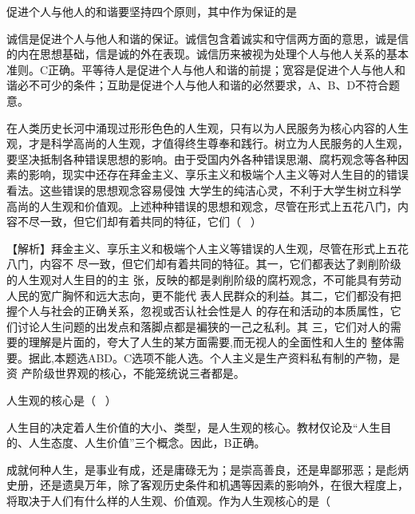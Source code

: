 \question 促进个人与他人的和谐要坚持四个原则，其中作为保证的是
\par{}
\begin{solution}诚信是促进个人与他人和谐的保证。诚信包含着诚实和守信两方面的意思，诚是信的内在思想基础，信是诚的外在表现。诚信历来被视为处理个人与他人关系的基本准则。C正确。平等待人是促进个人与他人和谐的前提；宽容是促进个人与他人和谐必不可少的条件；互助是促进个人与他人和谐的必然要求，A、B、D不符合题意。
\end{solution}
\question 在人类历史长河中涌现过形形色色的人生观，只有以为人民服务为核心内容的人生观，才是科学高尚的人生观，才值得终生尊奉和践行。树立为人民服务的人生观，要坚决抵制各种错误思想的影响。由于受国内外各种错误思潮、腐朽观念等各种因素的影响，现实中还存在拜金主义、享乐主义和极端个人主义等对人生目的的错误看法。这些错误的思想观念容易侵蚀
大学生的纯洁心灵，不利于大学生树立科学高尚的人生观和价值观。上述种种错误的思想和观念，尽管在形式上五花八门，内容不尽一致，但它们却有着共同的特征，它们（
~）
\par{}
\begin{solution}【解析】拜金主义、享乐主义和极端个人主义等错误的人生观，尽管在形式上五花八门，内容不
尽一致，但它们却有着共同的特征。其一，它们都表达了剥削阶级的人生观对人生目的的主
张，反映的都是剥削阶级的腐朽观念，不可能具有劳动人民的宽广胸怀和远大志向，更不能代
表人民群众的利益。其二，它们都没有把握个人与社会的正确关系，忽视或否认社会性是人
的存在和活动的本质属性，它们讨论人生问题的出发点和落脚点都是褊狭的一己之私利。其
三，它们对人的需要的理解是片面的，夸大了人生的某方面需要,而无视人的全面性和人生的
整体需要。据此,本题选ABD。C选项不能人选。个人主义是生产资料私有制的产物，是资
产阶级世界观的核心，不能笼统说三者都是。
\end{solution}
\question 人生观的核心是（ ~）
\par{}
\begin{solution}人生目的决定着人生价值的大小、类型，是人生观的核心。教材仅论及``人生目的、人生态度、人生价值''三个概念。因此，B正确。
\end{solution}
\question 成就何种人生，是事业有成，还是庸碌无为；是崇高善良，还是卑鄙邪恶；是彪炳史册，还是遗臭万年，除了客观历史条件和机遇等因素的影响外，在很大程度上，将取决于人们有什么样的人生观、价值观。作为人生观核心的是（
